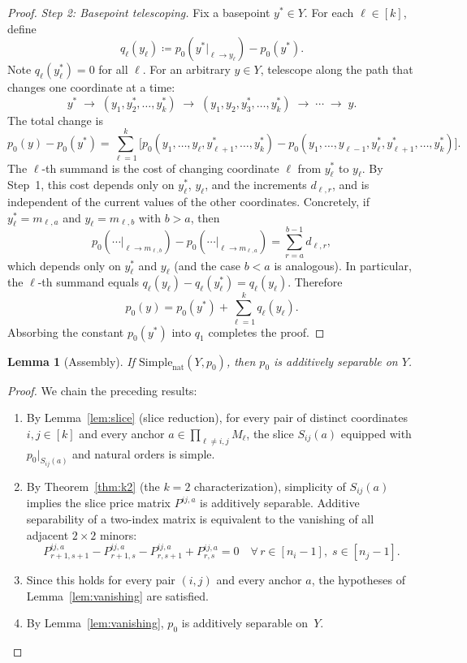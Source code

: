 \documentclass[11pt]{article}
\newtheorem{lemma}[theorem]{Lemma}
\newcommand{\Simplenat}{\mathrm{Simple}_{\mathrm{nat}}}
\begin{document}
\begin{proof}
\emph{Step 2: Basepoint telescoping.}
Fix a basepoint $y^* \in Y$.  For each $\ell \in [k]$, define
\[
  q_\ell(y_\ell) \coloneqq p_0(y^*|_{\ell \to y_\ell}) - p_0(y^*).
\]
Note $q_\ell(y^*_\ell) = 0$ for all $\ell$.
For an arbitrary $y \in Y$, telescope along the path that changes one coordinate at a time:
\[
  y^* \;\to\; (y_1, y^*_2, \dots, y^*_k) \;\to\; (y_1, y_2, y^*_3, \dots, y^*_k) \;\to\; \cdots \;\to\; y.
\]
The total change is
\[
  p_0(y) - p_0(y^*) = \sum_{\ell=1}^k \bigl[p_0(y_1,\dots,y_\ell, y^*_{\ell+1}, \dots, y^*_k) -
  p_0(y_1,\dots,y_{\ell-1}, y^*_\ell, y^*_{\ell+1},\dots,y^*_k)\bigr].
\]
The $\ell$-th summand is the cost of changing coordinate $\ell$ from $y^*_\ell$ to $y_\ell$.
By Step~1, this cost depends only on $y^*_\ell$, $y_\ell$, and the increments $d_{\ell,r}$,
and is independent of the current values of the other coordinates.
Concretely, if $y^*_\ell = m_{\ell,a}$ and $y_\ell = m_{\ell,b}$ with $b > a$, then
\[
  p_0(\cdots|_{\ell \to m_{\ell,b}}) - p_0(\cdots|_{\ell \to m_{\ell,a}}) = \sum_{r=a}^{b-1} d_{\ell,r},
\]
which depends only on $y^*_\ell$ and $y_\ell$ (and the case $b < a$ is analogous).
In particular, the $\ell$-th summand equals $q_\ell(y_\ell) - q_\ell(y^*_\ell) = q_\ell(y_\ell)$.
Therefore
\[
  p_0(y) = p_0(y^*) + \sum_{\ell=1}^k q_\ell(y_\ell).
\]
Absorbing the constant $p_0(y^*)$ into $q_1$ completes the proof.
\end{proof}

\begin{lemma}[Assembly]\label{lem:assembly}
If $\Simplenat(Y, p_0)$, then $p_0$ is additively separable on $Y$.
\end{lemma}

\begin{proof}
We chain the preceding results:
\begin{enumerate}[label=(\arabic*)]
  \item By Lemma~\ref{lem:slice} (slice reduction), for every pair of distinct coordinates
    $i,j \in [k]$ and every anchor $a \in \prod_{\ell \neq i,j} M_\ell$,
    the slice $S_{ij}(a)$ equipped with $p_0|_{S_{ij}(a)}$ and natural orders is simple.
  \item By Theorem~\ref{thm:k2} (the $k=2$ characterization), simplicity
    of $S_{ij}(a)$ implies the slice price matrix $P^{ij,a}$ is additively separable.
    Additive separability of a two-index matrix is equivalent to the vanishing of all
    adjacent $2 \times 2$ minors:
    \[
      P^{ij,a}_{r+1,s+1} - P^{ij,a}_{r+1,s} - P^{ij,a}_{r,s+1} + P^{ij,a}_{r,s} = 0
      \quad \forall\, r \in [n_i - 1],\; s \in [n_j - 1].
    \]
  \item Since this holds for every pair $(i,j)$ and every anchor $a$,
    the hypotheses of Lemma~\ref{lem:vanishing} are satisfied.
  \item By Lemma~\ref{lem:vanishing}, $p_0$ is additively separable on~$Y$.  \qedhere
\end{enumerate}
\end{proof}
\end{document}
